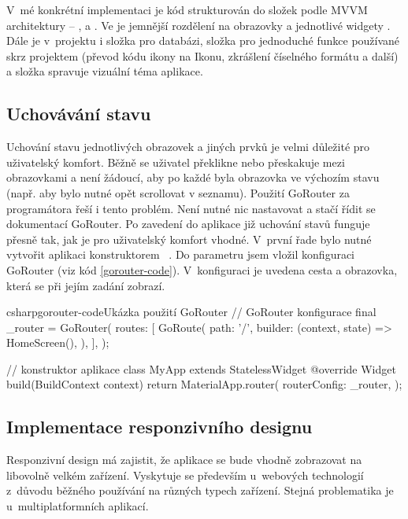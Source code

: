 \documentclass[
  biblatex,
  figures=true,
  tables=false,
  glossaries,
  index
]{kidiplom}
\begin{document}
V~mé konkrétní implementaci je kód strukturován do složek podle MVVM architektury -- ,  a . Ve  je jemnější rozdělení na obrazovky  a jednotlivé widgety . Dále je v~projektu i složka  pro databázi, složka  pro jednoduché funkce používané skrz projektem (převod kódu ikony na Ikonu, zkrášlení číselného formátu a další) a složka  spravuje vizuální téma aplikace.

\subsection{Uchovávání stavu}
Uchování stavu jednotlivých obrazovek a jiných prvků je velmi důležité pro uživatelský komfort. Běžně se uživatel překlikne nebo přeskakuje mezi obrazovkami a není žádoucí, aby po každé byla obrazovka ve výchozím stavu (např. aby bylo nutné opět scrollovat v seznamu). Použití GoRouter za programátora řeší i tento problém. Není nutné nic nastavovat a stačí řídit se dokumentací GoRouter. Po zavedení do aplikace již uchování stavů funguje přesně tak, jak je pro uživatelský komfort vhodné. V~první řade bylo nutné vytvořit aplikaci konstruktorem ~. Do parametru  jsem vložil konfiguraci GoRouter (viz kód \ref{gorouter-code}). V~konfiguraci je uvedena cesta a obrazovka, která se při jejím zadání zobrazí.

\begin{kicode}{csharp}{gorouter-code}{Ukázka použití GoRouter}
  // GoRouter konfigurace
  final _router = GoRouter(
    routes: [
      GoRoute(
        path: '/',
        builder: (context, state) => HomeScreen(),
      ),
    ],
  );

  // konstruktor aplikace
  class MyApp extends StatelessWidget {
    @override
    Widget build(BuildContext context) {
      return MaterialApp.router(
        routerConfig: _router,
      );
    }
  }
\end{kicode}

\subsection{Implementace responzivního designu}
Responzivní design má zajistit, že aplikace se bude vhodně zobrazovat na libovolně velkém zařízení. Vyskytuje se především u~webových technologií z~důvodu běžného používání na různých typech zařízení. Stejná problematika je u~multiplatformních aplikací.
\end{document}
